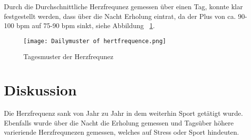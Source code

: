 \documentclass[a4paper,12pt]{scrartcl}
\begin{document}
Durch die Durchschnittliche Herzfrequnez gemessen über einen Tag, konnte klar festgestellt werden, dass über die Nacht Erholung eintrat, da der Plus von ca. 90-100 bpm auf 75-90 bpm sinkt, siehe Abbildung ~\ref{fig:daily heartfrequence}.

\begin{figure}
    \centering
    \texttt{[image: Dailymuster of hertfrequence.png]}
    \caption{Tagesmuster der Herzfrequnez}
    \label{fig:daily heartfrequence}
\end{figure}


\section{Diskussion}
Die Herzfrequenz sank von Jahr zu Jahr in dem weiterhin Sport getätigt wurde. Ebenfalls wurde über die Nacht die Erholung gemessen und Tagsüber höhere varieriende Herzfrequnezen gemessen, welches auf Stress oder Sport hindeuten. 


\end{document}
